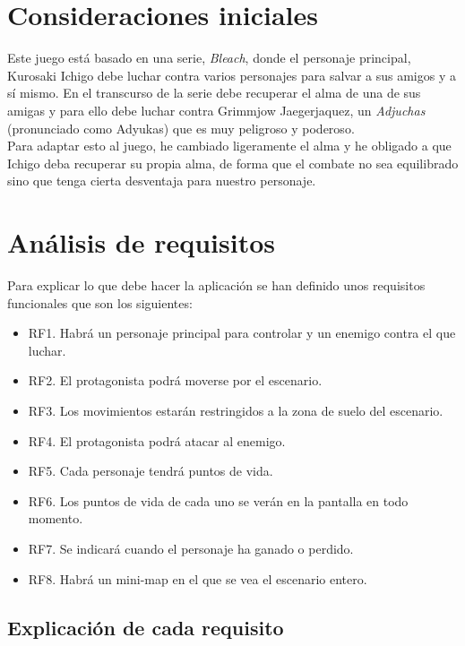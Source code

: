 \documentclass[11pt,a4paper]{article}
\begin{document}
\newpage

\section{Consideraciones iniciales}

Este juego está basado en una serie, \textit{Bleach}, donde el personaje principal, Kurosaki Ichigo debe luchar contra varios personajes para salvar a sus amigos y a sí mismo. En el transcurso de la serie debe recuperar el alma de una de sus amigas y para ello debe luchar contra Grimmjow  Jaegerjaquez, un \textit{Adjuchas} (pronunciado como Adyukas) que es muy peligroso y poderoso.\\

Para adaptar esto al juego, he cambiado ligeramente el alma y he obligado a que Ichigo deba recuperar su propia alma, de forma que el combate no sea equilibrado sino que tenga cierta desventaja para nuestro personaje.

\section{Análisis de requisitos}

Para explicar lo que debe hacer la aplicación se han definido unos requisitos funcionales que son los siguientes:

\begin{itemize}
	\item RF1. Habrá un personaje principal para controlar y un enemigo contra el que luchar.
	\item RF2. El protagonista podrá moverse por el escenario.
	\item RF3. Los movimientos estarán restringidos a la zona de suelo del escenario.
	\item RF4. El protagonista podrá atacar al enemigo.
	\item RF5. Cada personaje tendrá puntos de vida.
	\item RF6. Los puntos de vida de cada uno se verán en la pantalla en todo momento.
	\item RF7. Se indicará cuando el personaje ha ganado o perdido.
	\item RF8. Habrá un mini-map en el que se vea el escenario entero.
\end{itemize}

\subsection{Explicación de cada requisito}
\end{document}
